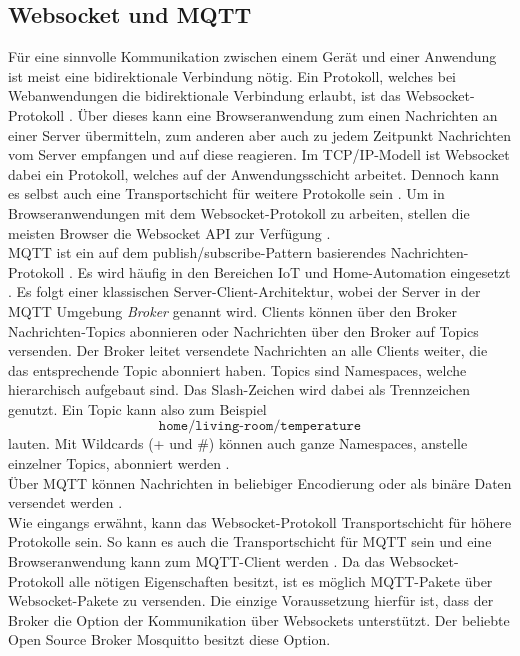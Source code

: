 \subsection{Websocket und MQTT}
\label{subs:websocket-und-mqtt}

Für eine sinnvolle Kommunikation zwischen einem Gerät und einer Anwendung ist meist
eine bidirektionale Verbindung nötig. Ein Protokoll, welches bei Webanwendungen die 
bidirektionale Verbindung erlaubt, ist das Websocket-Protokoll \cite{rfc-websocket}. Über dieses
kann eine Browseranwendung zum einen Nachrichten an einer Server übermitteln, zum anderen 
aber auch zu jedem Zeitpunkt Nachrichten vom Server empfangen und auf diese reagieren.
Im TCP/IP-Modell ist Websocket dabei ein Protokoll, welches auf der Anwendungsschicht arbeitet. 
Dennoch kann es selbst auch eine Transportschicht für weitere Protokolle sein \cite{websocket-definitive}.
Um in Browseranwendungen mit dem Websocket-Protokoll zu arbeiten, stellen die meisten 
Browser die Websocket API zur Verfügung \cite{websocket-api}.\\

MQTT ist ein auf dem publish/subscribe-Pattern basierendes Nachrichten-Protokoll \cite{mqtt-standard}.
Es wird häufig in den Bereichen IoT und Home-Automation eingesetzt \cite{mqtt-org}. Es folgt einer
klassischen Server-Client-Architektur, wobei der Server in der MQTT Umgebung \emph{Broker}
genannt wird. Clients können über den Broker Nachrichten-Topics abonnieren oder Nachrichten
über den Broker auf Topics versenden. Der Broker leitet versendete Nachrichten an alle Clients
weiter, die das entsprechende Topic abonniert haben. Topics sind Namespaces, welche hierarchisch
aufgebaut sind. Das Slash-Zeichen wird dabei als Trennzeichen genutzt. Ein Topic kann also zum 
Beispiel 
\[\texttt{home/living-room/temperature} \]
lauten. Mit Wildcards (+ und \#) können auch ganze
Namespaces, anstelle einzelner Topics, abonniert werden \cite{mqtt-man-page}.\\
Über MQTT können Nachrichten in beliebiger Encodierung oder als binäre Daten versendet werden
\cite{mqtt-essentials-part-4}.\\

Wie eingangs erwähnt, kann das Websocket-Protokoll Transportschicht für
höhere Protokolle sein. So kann es auch die Transportschicht für MQTT sein und eine Browseranwendung
kann zum MQTT-Client werden \cite{mqtt-over-websockets}. 
Da das Websocket-Protokoll alle nötigen Eigenschaften besitzt, ist es
möglich MQTT-Pakete über Websocket-Pakete zu versenden. Die einzige Voraussetzung hierfür ist, dass der Broker
die Option der Kommunikation über Websockets unterstützt. Der beliebte Open Source Broker Mosquitto \cite{mosquitto}
besitzt diese Option.